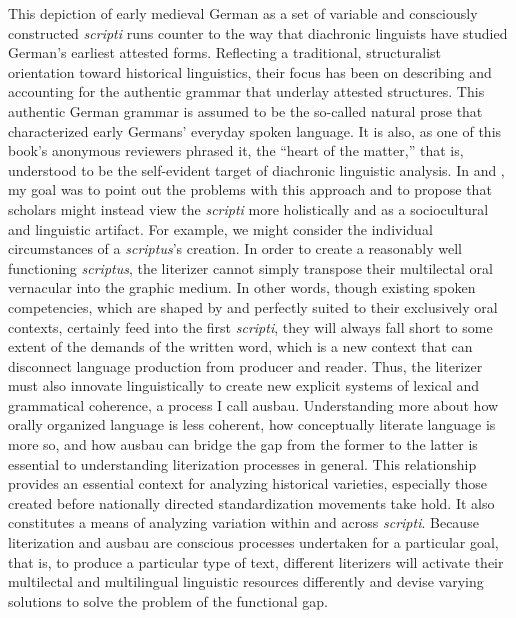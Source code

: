 This depiction of early medieval German as a set of variable and consciously constructed \textit{scripti} runs counter to the way that diachronic linguists have studied German’s earliest attested forms. Reflecting a traditional, structuralist orientation toward historical linguistics, their focus has been on describing and accounting for the authentic grammar that underlay attested structures. This authentic German grammar is assumed to be the so-called natural prose that characterized early Germans’ everyday spoken language. It is also, as one of this book’s anonymous reviewers phrased it, the “heart of the matter,” that is, understood to be the self-evident target of diachronic linguistic analysis. In  and , my goal was to point out the problems with this approach and to propose that scholars might instead view the \textit{scripti} more holistically and as a sociocultural and linguistic artifact. For example, we might consider the individual circumstances of a \textit{scriptus}’s creation. In order to create a reasonably well functioning \textit{scriptus}, the literizer cannot simply transpose their multilectal oral vernacular into the graphic medium. In other words, though existing spoken competencies, which are shaped by and perfectly suited to their exclusively oral contexts, certainly feed into the first \textit{scripti}, they will always fall short to some extent of the demands of the written word, which is a new context that can disconnect language production from producer and reader. Thus, the literizer must also innovate linguistically to create new explicit systems of lexical and grammatical coherence, a process I call ausbau. Understanding more about how orally organized language is less coherent, how conceptually literate language is more so, and how ausbau can bridge the gap from the former to the latter is essential to understanding literization processes in general. This relationship provides an essential context for analyzing historical varieties, especially those created before nationally directed standardization movements take hold. It also constitutes a means of analyzing variation within and across \textit{scripti}. Because literization and ausbau are conscious processes undertaken for a particular goal, that is, to produce a particular type of text, different literizers will activate their multilectal and multilingual linguistic resources differently and devise varying solutions to solve the problem of the functional gap.

